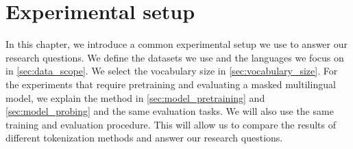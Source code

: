 
\chapter{Experimental setup}


In this chapter, we introduce a common experimental setup we use to answer our research questions. We define the datasets we use and the languages we focus on in \autoref{sec:data_scope}. We select the vocabulary size in \autoref{sec:vocabulary_size}. For the experiments that require pretraining and evaluating a masked multilingual model, we explain the method in \autoref{sec:model_pretraining} and \autoref{sec:model_probing} and the same evaluation tasks. We will also use the same training and evaluation procedure. This will allow us to compare the results of different tokenization methods and answer our research questions.





    

